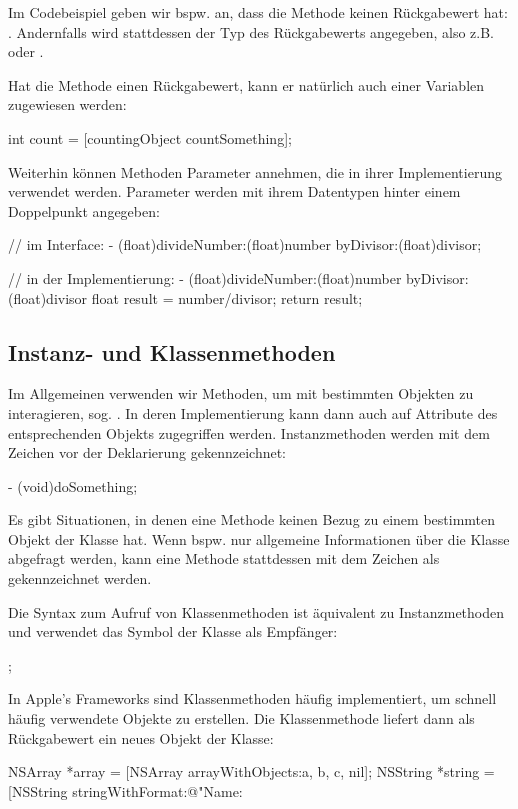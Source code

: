 \documentclass[parskip=half, final]{scrreprt}
\begin{document}
Im Codebeispiel  geben wir bspw. an, dass die Methode  keinen Rückgabewert hat: . Andernfalls wird stattdessen der Typ des Rückgabewerts angegeben, also z.B.  oder .

Hat die Methode einen Rückgabewert, kann er natürlich auch einer Variablen zugewiesen werden:
\begin{objclst}
int count = [countingObject countSomething];
\end{objclst}

Weiterhin können Methoden Parameter annehmen, die in ihrer Implementierung verwendet werden. Parameter werden mit ihrem Datentypen hinter einem Doppelpunkt angegeben:
\begin{objclst}
// im Interface:
- (float)divideNumber:(float)number byDivisor:(float)divisor;
\end{objclst}
\begin{objclst}
// in der Implementierung:
- (float)divideNumber:(float)number byDivisor:(float)divisor {
    float result = number/divisor;
    return result;
}
\end{objclst}

\subsection{Instanz- und Klassenmethoden}

Im Allgemeinen verwenden wir Methoden, um mit bestimmten Objekten zu interagieren, sog. . In deren Implementierung kann dann auch auf Attribute des entsprechenden Objekts zugegriffen werden. Instanzmethoden werden mit dem Zeichen \objc{-} vor der Deklarierung gekennzeichnet:
\begin{objclst}
- (void)doSomething;
\end{objclst}

Es gibt Situationen, in denen eine Methode keinen Bezug zu einem bestimmten Objekt der Klasse hat. Wenn bspw. nur allgemeine Informationen über die Klasse abgefragt werden, kann eine Methode stattdessen mit dem Zeichen \objc{+} als  gekennzeichnet werden.

Die Syntax zum Aufruf von Klassenmethoden ist äquivalent zu Instanzmethoden und verwendet das Symbol der Klasse als Empfänger:
\begin{objclst}
;
\end{objclst}
In Apple's Frameworks sind Klassenmethoden häufig implementiert, um schnell häufig verwendete Objekte zu erstellen. Die Klassenmethode liefert dann als Rückgabewert ein neues Objekt der Klasse:
\begin{objclst}
NSArray *array = [NSArray arrayWithObjects:a, b, c, nil];
NSString *string = [NSString stringWithFormat:@"Name: %
\end{objclst}
\end{document}
